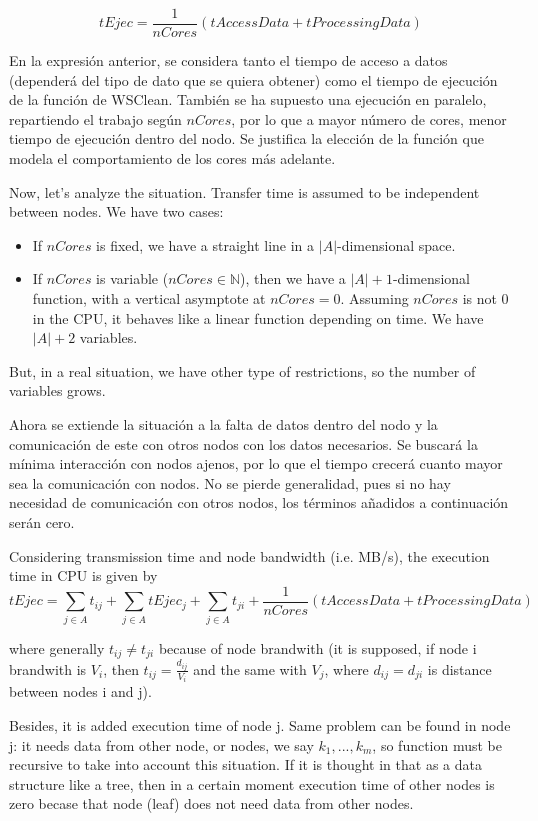 \documentclass{article}
\begin{document}
\[
tEjec = \frac{1}{nCores}(tAccessData + tProcessingData)
\]

En la expresión anterior, se considera tanto el tiempo de acceso a datos (dependerá del tipo de dato que se quiera obtener) como el tiempo de ejecución de la función de WSClean. También se ha supuesto una ejecución en paralelo, repartiendo el trabajo según \(nCores\), por lo que a mayor número de cores, menor tiempo de ejecución dentro del nodo. Se justifica la elección de la función que modela el comportamiento de los cores más adelante.

Now, let's analyze the situation. Transfer time is assumed to be independent between nodes. We have two cases:

\begin{itemize}
  \item If $nCores$ is fixed, we have a straight line in a $|A|$-dimensional space.
  \item If $nCores$ is variable ($nCores \in \mathbb{N}$), then we have a $|A|+1$-dimensional function, with a vertical asymptote at $nCores=0$. Assuming $nCores$ is not 0 in the CPU, it behaves like a linear function depending on time. We have $|A|+2$ variables.
\end{itemize}

But, in a real situation, we have other type of restrictions, so the number of variables grows.

Ahora se extiende la situación a la falta de datos dentro del nodo y la comunicación de este con otros nodos con los datos necesarios. Se buscará la mínima interacción con nodos ajenos, por lo que el tiempo crecerá cuanto mayor sea la comunicación con nodos. No se pierde generalidad, pues si no hay necesidad de comunicación con otros nodos, los términos añadidos a continuación serán cero.

Considering transmission time and node bandwidth (i.e. MB/s), the execution time in CPU is given by
\[
tEjec = \sum_{j \in A} t_{ij} + \sum_{j \in A} tEjec_j + \sum_{j \in A} t_{ji} + \frac{1}{nCores}(tAccessData + tProcessingData)
\]

where generally \(t_{ij} \neq t_{ji}\) because of node brandwith (it is supposed, if node i brandwith is \(V_i\), then \(t_{ij}=\frac{d_{ij}}{V_i}\) and the same with \(V_j\), where \(d_{ij}=d_{ji}\) is distance between nodes i and j).

Besides, it is added execution time of node j. Same problem can be found in node j: it needs data from other node, or nodes, we say \(k_1,...,k_m\), so function must be recursive to take into account this situation. If it is thought in that as a data structure like a tree, then in a certain moment execution time of other nodes is zero becase that node (leaf) does not need data from other nodes.
\end{document}
